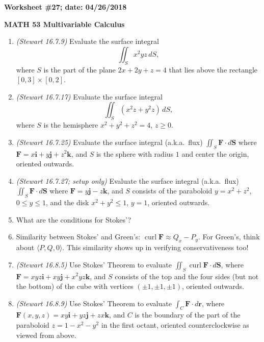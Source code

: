 \documentclass{article}
\newcommand{\ii}{\mathbf{i}}
\newcommand{\jj}{\mathbf{j}}
\newcommand{\kk}{\mathbf{k}}
\newcommand{\rr}{\mathbf{r}}
\newcommand{\FF}{\mathbf{F}}
\newcommand{\SSS}{\mathbf{S}}
\DeclareMathOperator*{\curl}{curl}
\begin{document}
{\bf Worksheet \#27; date: 04/26/2018}

{\bf MATH 53 Multivariable Calculus}

\begin{enumerate}
\item {\em (Stewart 16.7.9)} Evaluate the surface integral
\[
\iint_S x^2 yz \,dS,
\]
where $S$ is the part of the plane $2x + 2y + z = 4$ that lies above the rectangle $[0, 3] \times [0, 2]$.

\item {\em (Stewart 16.7.17)} Evaluate the surface integral
\[
\iint_S (x^2 z + y^2 z) \,dS,
\]
where $S$ is the hemisphere $x^2 + y^2 + z^2 = 4$, $z \ge 0$.

\item {\em (Stewart 16.7.25)} Evaluate the surface integral (a.k.a.\ flux) $\iint_S \FF \cdot d\SSS$ where $\FF = x \ii + y \jj + z^2 \kk$, and $S$ is the sphere with radius $1$ and center the origin, oriented outwards.

\item {\em (Stewart 16.7.27; setup only)} Evaluate the surface integral (a.k.a.\ flux) $\iint_S \FF \cdot d\SSS$ where $\FF = y \jj - z \kk$, and $S$ consists of the paraboloid $y = x^2 + z^2$, $0 \le y \le 1$, and the disk $x^2 + y^2 \le 1$, $y = 1$, oriented outwards.

\item What are the conditions for Stokes'?

\item Similarity between Stokes' and Green's: $\curl \mathbf{F} \approx Q_x - P_y$. For Green's, think about $\langle P, Q, 0 \rangle$. This similarity shows up in verifying conservativeness too!

\item {\em (Stewart 16.8.5)} Use Stokes' Theorem to evaluate $\iint_S \curl \FF \cdot d\SSS$, where $\FF = xyz \ii + xy \jj + x^2 yz \kk$, and $S$ consists of the top and the four sides (but not the bottom) of the cube with vertices $(\pm 1, \pm 1, \pm 1)$, oriented outwards.

\item {\em (Stewart 16.8.9)} Use Stokes' Theorem to evaluate $\int_C \FF \cdot d\rr$, where $\FF(x, y, z) = xy \ii + yz \jj + zx \kk$, and $C$ is the boundary of the part of the paraboloid $z = 1 - x^2 - y^2$ in the first octant, oriented counterclockwise as viewed from above.
\end{enumerate}
\end{document}

